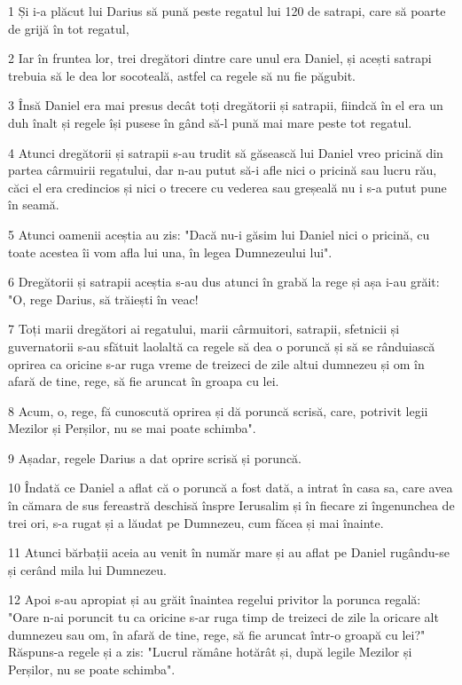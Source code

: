 \par 1 Și i-a plăcut lui Darius să pună peste regatul lui 120 de satrapi, care să poarte de grijă în tot regatul,
\par 2 Iar în fruntea lor, trei dregători dintre care unul era Daniel, și acești satrapi trebuia să le dea lor socoteală, astfel ca regele să nu fie păgubit.
\par 3 Însă Daniel era mai presus decât toți dregătorii și satrapii, fiindcă în el era un duh înalt și regele își pusese în gând să-l pună mai mare peste tot regatul.
\par 4 Atunci dregătorii și satrapii s-au trudit să găsească lui Daniel vreo pricină din partea cârmuirii regatului, dar n-au putut să-i afle nici o pricină sau lucru rău, căci el era credincios și nici o trecere cu vederea sau greșeală nu i s-a putut pune în seamă.
\par 5 Atunci oamenii aceștia au zis: "Dacă nu-i găsim lui Daniel nici o pricină, cu toate acestea îi vom afla lui una, în legea Dumnezeului lui".
\par 6 Dregătorii și satrapii aceștia s-au dus atunci în grabă la rege și așa i-au grăit: "O, rege Darius, să trăiești în veac!
\par 7 Toți marii dregători ai regatului, marii cârmuitori, satrapii, sfetnicii și guvernatorii s-au sfătuit laolaltă ca regele să dea o poruncă și să se rânduiască oprirea ca oricine s-ar ruga vreme de treizeci de zile altui dumnezeu și om în afară de tine, rege, să fie aruncat în groapa cu lei.
\par 8 Acum, o, rege, fă cunoscută oprirea și dă poruncă scrisă, care, potrivit legii Mezilor și Perșilor, nu se mai poate schimba".
\par 9 Așadar, regele Darius a dat oprire scrisă și poruncă.
\par 10 Îndată ce Daniel a aflat că o poruncă a fost dată, a intrat în casa sa, care avea în cămara de sus fereastră deschisă înspre Ierusalim și în fiecare zi îngenunchea de trei ori, s-a rugat și a lăudat pe Dumnezeu, cum făcea și mai înainte.
\par 11 Atunci bărbații aceia au venit în număr mare și au aflat pe Daniel rugându-se și cerând mila lui Dumnezeu.
\par 12 Apoi s-au apropiat și au grăit înaintea regelui privitor la porunca regală: "Oare n-ai poruncit tu ca oricine s-ar ruga timp de treizeci de zile la oricare alt dumnezeu sau om, în afară de tine, rege, să fie aruncat într-o groapă cu lei?" Răspuns-a regele și a zis: "Lucrul rămâne hotărât și, după legile Mezilor și Perșilor, nu se poate schimba".
